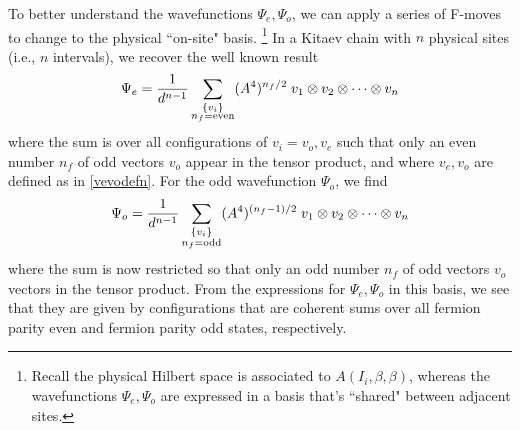 To better understand the wavefunctions $\Psi_e,\Psi_o$, we can apply a series of F-moves to change to the physical ``on-site" basis. \footnote{Recall the physical Hilbert space is associated to $A(I_i,\beta, \beta)$, 
whereas the wavefunctions $\Psi_e,\Psi_o$ are expressed in a basis that's ``shared" between adjacent sites.}
In a Kitaev chain with $n$ physical sites (i.e., $n$ intervals), 
we recover the well known result
\begin{align}
\Psi_e = \frac{1}{d^{n-1}} \sum_{\substack{ \{ v_i\} \\  n_f = \text{even} }} (A^4)^{n_f/2} \; v_1 \otimes v_2 \otimes \cdots \otimes v_n
\end{align}
where the sum is over all configurations of $v_i =v_o,v_e$ such that only an even number $n_f$ of odd vectors $v_o$ appear 
in the tensor product, and where $v_e,v_o$ are defined as in \eqref{vevodefn}.
For the odd wavefunction $\Psi_o$, we find 
\begin{align}
\Psi_o = \frac{1}{d^{n-1}}\sum_{\substack{ \{ v_i\} \\  n_f = \text{odd} }}  (A^4)^{(n_f-1)/2}\; v_1 \otimes v_2 \otimes \cdots \otimes v_n
\end{align}
where the sum is now restricted so that only an odd number $n_f$ of odd vectors $v_o$ vectors in the tensor product.
From the expressions for $\Psi_e,\Psi_o$ in this basis, we see that they are given by configurations 
that are coherent sums over all fermion parity even and fermion parity odd states, respectively.  


